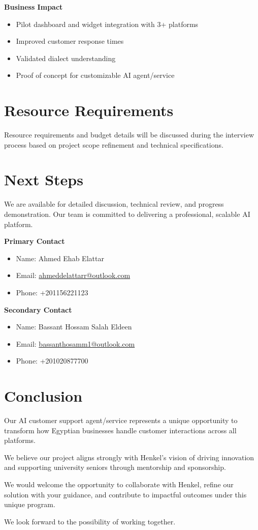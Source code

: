 \documentclass[12pt,a4paper]{article}
\begin{document}
\textbf{Business Impact}
\begin{itemize}
    \item Pilot dashboard and widget integration with 3+ platforms
    \item Improved customer response times
    \item Validated dialect understanding
    \item Proof of concept for customizable AI agent/service
\end{itemize}

\section*{Resource Requirements}
Resource requirements and budget details will be discussed during the interview process based on project scope refinement and technical specifications.

\section*{Next Steps}
We are available for detailed discussion, technical review, and progress demonstration. Our team is committed to delivering a professional, scalable AI platform.

\textbf{Primary Contact}
\begin{itemize}
    \item Name: Ahmed Ehab Elattar
    \item Email: \href{mailto:ahmeddelattarr@outlook.com}{ahmeddelattarr@outlook.com}
    \item Phone: +201156221123
\end{itemize}

\textbf{Secondary Contact}
\begin{itemize}
    \item Name: Bassant Hossam Salah Eldeen
    \item Email: \href{mailto:bassanthosamm1@outlook.com}{bassanthosamm1@outlook.com}
    \item Phone: +201020877700
\end{itemize}

\section*{Conclusion}
Our AI customer support agent/service represents a unique opportunity to transform how Egyptian businesses handle customer interactions across all platforms. 

We believe our project aligns strongly with Henkel’s vision of driving innovation and supporting university seniors through mentorship and sponsorship.  

We would welcome the opportunity to collaborate with Henkel, refine our solution with your guidance, and contribute to impactful outcomes under this unique program. 

We look forward to the possibility of working together.
\end{document}
